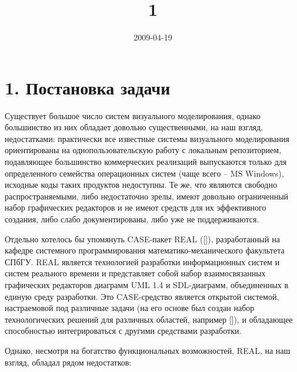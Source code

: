\documentclass[a4paper]{article}
\title{1}
\author{}
\date{2009-04-19}
\begin{document}
\clearpage\setcounter{page}{1}\pagestyle{Standard}
\section{1. Постановка задачи}
{
Существует большое число систем визуального моделирования, однако
большинство из них обладает довольно существенными, на наш взгляд,
недостатками: практически все известные системы визуального
моделирования ориентированы на однопользовательскую работу с локальным
репозиторием, подавляющее большинство коммерческих реализаций
выпускаются только для определенного семейства операционных систем
(чаще всего – MS Windows), исходные коды таких продуктов недоступны. Те
же, что являются свободно распространяемыми, либо недостаточно зрелы,
имеют довольно ограниченный набор графических редакторов и не имеют
средств для их эффективного создания, либо слабо документированы, либо
уже не поддерживаются. }

{
Отдельно хотелось бы упомянуть CASE-пакет REAL ([]), разработанный на
кафедре системного программирования математико-механического факультета
СПбГУ. REAL является технологией разработки информационных систем и
систем реального времени и представляет собой набор взаимосвязанных
графических редакторов диаграмм UML 1.4 и SDL-диаграмм, объединенных в
единую среду разработки. Это CASE-средство является открытой системой,
настраемовой под различные задачи (на его основе был создан набор
технологических решений для различных областей, например []), и
обладающее способностью интегрироваться с другими средствами
разработки. }

{
Однако, несмотря на богатство функциональных возможностей,
\foreignlanguage{english}{REAL}, на наш взгляд, обладал рядом
недостатков:}
\end{document}
